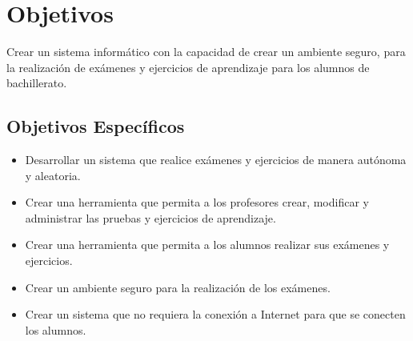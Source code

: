 \section{Objetivos}

Crear un sistema informático con la capacidad de crear un ambiente seguro,
para la realización de exámenes y ejercicios de aprendizaje para los alumnos
de bachillerato.

\subsection{Objetivos Específicos}

\begin{itemize}
    \item \label{itm:objetivo1} Desarrollar un sistema que realice exámenes
      y ejercicios de manera autónoma y aleatoria.
    \item \label{itm:objetivo2} Crear una herramienta que permita a los
      profesores crear, modificar y administrar las pruebas y ejercicios de
      aprendizaje.
    \item \label{itm:objetivo3} Crear una herramienta que permita a los
      alumnos realizar sus exámenes y ejercicios.
    \item \label{itm:objetivo4} Crear un ambiente seguro para la realización
      de los exámenes.
    \item \label{itm:objetivo5} Crear un sistema que no requiera la conexión
      a Internet para que se conecten los alumnos.
\end{itemize}

